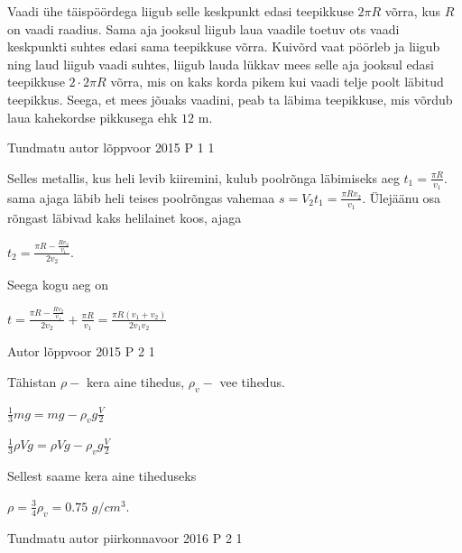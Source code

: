 \documentclass[11pt]{article}
\begin{document}
{{\ifSolution
Vaadi ühe täispöördega liigub selle keskpunkt edasi teepikkuse $ 2\pi  R$ võrra, kus $R$ on vaadi raadius. Sama aja jooksul liigub laua vaadile toetuv ots vaadi keskpunkti suhtes edasi sama teepikkuse võrra. Kuivõrd vaat pöörleb ja liigub ning laud liigub vaadi suhtes, liigub lauda lükkav mees selle aja jooksul edasi teepikkuse $2 \cdot 2 \pi R$ võrra, mis on kaks korda pikem kui vaadi telje poolt läbitud teepikkus. Seega, et mees jõuaks vaadini, peab ta läbima teepikkuse, mis võrdub laua kahekordse pikkusega ehk $12$ m.
\fi
}


{Tundmatu autor} %
{lõppvoor} %
{2015} %
{P 1} %
{1} %
{

\ifSolution
Selles metallis, kus heli levib kiiremini, kulub poolrõnga läbimiseks aeg $t_1 = \frac{\pi R}{v_1}$. sama ajaga läbib heli teises poolrõngas vahemaa $s = V_2 t_1 = \frac{\pi R v_2}{v_1}$.
Ülejäänu osa rõngast läbivad kaks helilainet koos, ajaga 
\begin{center}
$t_2 = \frac{\pi R - \frac{R v_2}{v_1}}{2v_2}$.
\end{center}
Seega kogu aeg on 
\begin{center}
$t= \frac{\pi R - \frac{R v_2}{v_1}}{2v_2} + \frac{\pi R}{v_1} = \frac{\pi R (v_1 + v_2)}{2v_1 v_2}$
\end{center}
\fi
}

{Autor} %
{lõppvoor} %
{2015} %
{P 2} %
{1} %
{

\ifSolution
Tähistan $\rho -$ kera aine tihedus, $\rho_v -$ vee tihedus.
\begin{center}
$\frac{1}{3}mg = mg- \rho_v g \frac{V}{2}$
\end{center}
\begin{center}
$\frac{1}{3}\rho V g = \rho V g - \rho_v g \frac{V}{2}$
\end{center}
Sellest saame kera aine tiheduseks
\begin{center}
$\rho = \frac{3}{4} \rho_v = 0.75$ $g/cm^3$.
\end{center}
\fi
}

{Tundmatu autor} %
{piirkonnavoor} %
{2016} %
{P 2} %
{1} %
{

}}
\end{document}
